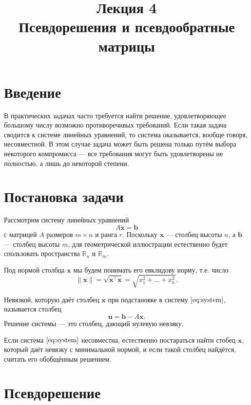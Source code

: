 \documentclass[11pt,a4paper]{article}
\title{Лекция 4 \\
    Псевдорешения и псевдообратные матрицы
    }
\begin{document}
    
    \maketitle
    
    
    \hypertarget{ux432ux432ux435ux434ux435ux43dux438ux435}{%
\section{Введение}\label{ux432ux432ux435ux434ux435ux43dux438ux435}}

В практических задачах часто требуется найти решение, удовлетворяющее
большому числу возможно противоречивых требований. Если такая задача
сводится к системе линейных уравнений, то система оказывается, вообще
говоря, несовместной. В этом случае задача может быть решена только
путём выбора некоторого компромисса --- все требования могут быть
удовлетворены не полностью, а лишь до некоторой степени.

    \hypertarget{ux43fux43eux441ux442ux430ux43dux43eux432ux43aux430-ux437ux430ux434ux430ux447ux438}{%
\section{Постановка
задачи}\label{ux43fux43eux441ux442ux430ux43dux43eux432ux43aux430-ux437ux430ux434ux430ux447ux438}}

Рассмотрим систему линейных уравнений \[
  A\mathbf{x} = \mathbf{b} \tag{1}\label{eq:system}
\] с матрицей \(A\) размеров \(m \times n\) и ранга \(r\). Поскольку
\(\mathbf{x}\) --- столбец высоты \(n\), а \(\mathbf{b}\) --- столбец
высоты \(m\), для геометрической иллюстрации естественно будет
спользовать пространства \(\mathbb{R}_n\) и \(\mathbb{R}_m\).

Под нормой столбца \(\mathbf{x}\) мы будем понимать его евклидову норму,
т.е. число \[
  \|\mathbf{x}\| = \sqrt{\mathbf{x^\top x}} = \sqrt{x_1^2 + \ldots + x_n^2}.
\]

Невязкой, которую даёт столбец \(\mathbf{x}\) при подстановке в систему
\(\eqref{eq:system}\), называется столбец \[
  \mathbf{u} = \mathbf{b} - A\mathbf{x}.
\] Решение системы --- это столбец, дающий нулевую невзяку.

Если система \(\eqref{eq:system}\) несовместна, естественно постараться
найти стобец \(\mathbf{x}\), который даёт невязку с минимальной нормой,
и если такой столбец найдётся, считать его обобщённым решением.

    \hypertarget{ux43fux441ux435ux432ux434ux43eux440ux435ux448ux435ux43dux438ux435}{%
\section{Псевдорешение}\label{ux43fux441ux435ux432ux434ux43eux440ux435ux448ux435ux43dux438ux435}}
\end{document}
